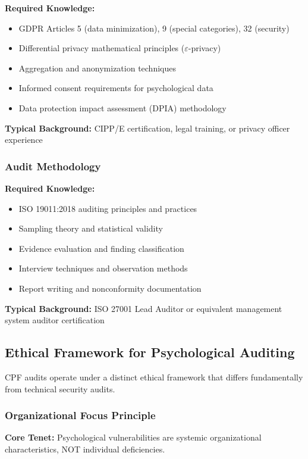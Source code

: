 \documentclass[11pt,a4paper]{article}
\begin{document}
\textbf{Required Knowledge:}
\begin{itemize}
\item GDPR Articles 5 (data minimization), 9 (special categories), 32 (security)
\item Differential privacy mathematical principles ($\varepsilon$-privacy)
\item Aggregation and anonymization techniques
\item Informed consent requirements for psychological data
\item Data protection impact assessment (DPIA) methodology
\end{itemize}

\textbf{Typical Background:} CIPP/E certification, legal training, or privacy officer experience

\subsubsection{Audit Methodology}

\textbf{Required Knowledge:}
\begin{itemize}
\item ISO 19011:2018 auditing principles and practices
\item Sampling theory and statistical validity
\item Evidence evaluation and finding classification
\item Interview techniques and observation methods
\item Report writing and nonconformity documentation
\end{itemize}

\textbf{Typical Background:} ISO 27001 Lead Auditor or equivalent management system auditor certification

\subsection{Ethical Framework for Psychological Auditing}

CPF audits operate under a distinct ethical framework that differs fundamentally from technical security audits.

\subsubsection{Organizational Focus Principle}

\textbf{Core Tenet:} Psychological vulnerabilities are systemic organizational characteristics, NOT individual deficiencies.
\end{document}

